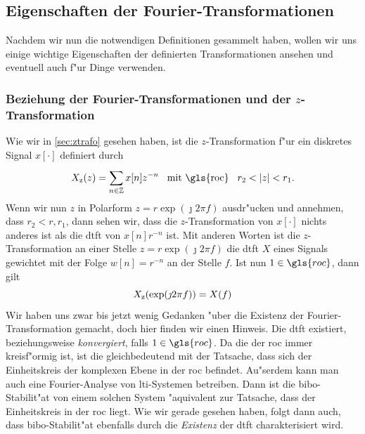 \subsection{Eigenschaften der Fourier-Transformationen}\label{sec:fourier:proper}
%
Nachdem wir nun die notwendigen Definitionen gesammelt haben, wollen wir uns einige wichtige Eigenschaften der definierten Transformationen ansehen und eventuell auch f"ur  Dinge verwenden.
%
\subsubsection{Beziehung der Fourier-Transformationen und der \texorpdfstring{$z$}{z}-Transformation}
%
Wie wir in \cref{sec:ztrafo} gesehen haben, ist die $z$-Transformation f"ur ein diskretes Signal $x[\cdot]$ definiert durch
\[
X_{\z}(z) = \Sum{n \in \Z}{}{x[n]z^{-n}} \Text{mit \gls{roc}} r_2 < \Abs{z} < r_1.
\]
Wenn wir nun $z$ in Polarform $z = r \exp(\jmath 2 \pi f)$ ausdr"ucken und annehmen, dass $r_2 < r , r_1$, dann sehen wir, dass die $z$-Transformation von $x[\cdot]$ nichts anderes ist als die \gls{dtft} von $x[n] r^{-n}$ ist.
Mit anderen Worten ist die $z$-Transformation an einer Stelle $z=r \exp(\jmath 2 \pi f)$ die \gls{dtft} $X$ eines Signals gewichtet mit der Folge $w[n] = r^{-n}$ an der Stelle $f$.
Ist nun $1 \in \gls{roc}$, dann gilt
\begin{equation}\label{eq:fourier:ztrafo}
    X_{{\rm z}}(\exp(\jmath 2 \pi f)) = X(f)
\end{equation}
Wir haben uns zwar bis jetzt wenig Gedanken "uber die Existenz der Fourier-Transformation gemacht, doch hier finden wir einen Hinweis. 
Die \gls{dtft} existiert, beziehungsweise \emph{konvergiert}, falls $1 \in \gls{roc}$.
Da die  der \gls{roc} immer kreisf"ormig ist, ist die gleichbedeutend mit der Tatsache, dass sich der Einheitskreis der komplexen Ebene in der \gls{roc} befindet.
Au"serdem kann man auch eine Fourier-Analyse von \gls{lti}-Systemen betreiben. 
Dann ist die \gls{bibo}-Stabilit"at von einem solchen System "aquivalent zur Tatsache, dass der Einheitskreis in der \gls{roc} liegt.
Wie wir gerade gesehen haben, folgt dann auch, dass \gls{bibo}-Stabilit"at ebenfalls durch die \emph{Existenz} der \gls{dtft} charakterisiert wird.
%
